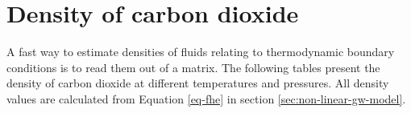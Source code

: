 \appendix
\chapter{Density of carbon dioxide}
A fast way to estimate densities of fluids relating to thermodynamic boundary conditions is to read them out of a matrix. The following tables present the density of carbon dioxide at different temperatures and pressures. All density values are calculated from Equation \ref{eq-fhe} in section \ref{sec:non-linear-gw-model}.

